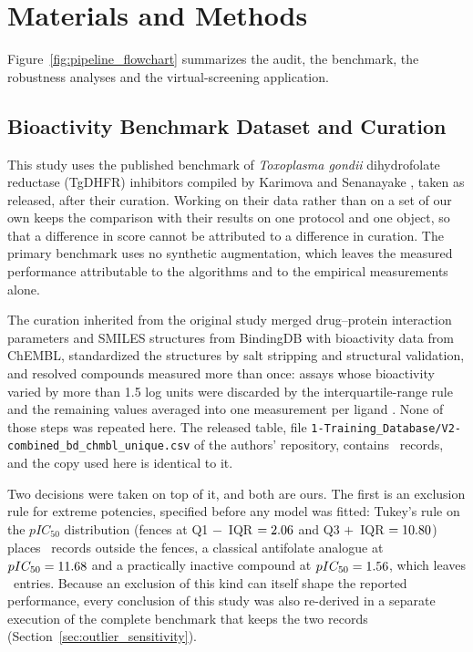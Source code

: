 \section{Materials and Methods}


Figure~\ref{fig:pipeline_flowchart} summarizes the audit, the benchmark, the robustness analyses and the
virtual-screening application.


\subsection{Bioactivity Benchmark Dataset and Curation}
\label{sec:materials_curation}

This study uses the published benchmark of \textit{Toxoplasma gondii} dihydrofolate reductase (TgDHFR) inhibitors
compiled by Karimova and Senanayake \citep{karimova2025}, taken as released, after their curation. Working on their
data rather than on a set of our own keeps the comparison with their results on one protocol and one object, so that a
difference in score cannot be attributed to a difference in curation. The primary benchmark uses no synthetic
augmentation, which leaves the measured performance attributable to the algorithms and to the empirical measurements
alone.

The curation inherited from the original study merged drug--protein interaction parameters and SMILES structures from
BindingDB with bioactivity data from ChEMBL, standardized the structures by salt stripping and structural validation,
and resolved compounds measured more than once: assays whose bioactivity varied by more than 1.5 log units were
discarded by the interquartile-range rule and the remaining values averaged into one measurement per ligand
\citep{karimova2025}. None of those steps was repeated here. The released table, file
\texttt{1-Training\_Database/V2-combined\_bd\_chmbl\_unique.csv} of the authors' repository, contains \DataNRaw\
records, and the copy used here is identical to it.

Two decisions were taken on top of it, and both are ours. The first is an exclusion rule for extreme potencies,
specified before any model was fitted: Tukey's rule on the $pIC_{50}$ distribution (fences at Q1 $-$ \IqrFactor\,IQR $=
2.06$ and Q3 $+$ \IqrFactor\,IQR $= 10.80$) places \DataNOutliers\ records outside the fences, a
classical antifolate analogue at $pIC_{50} = 11.68$ and a practically inactive compound at $pIC_{50} =
1.56$, which leaves \DataNAfterOutliers\ entries. Because an exclusion of this kind can itself shape the
reported performance, every conclusion of this study was also re-derived in a separate execution of the complete
benchmark that keeps the two records (Section~\ref{sec:outlier_sensitivity}).

